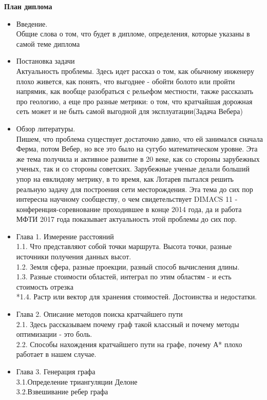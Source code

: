 \Large{\bf{План диплома}}
\begin{itemize}
\item Введение.\\
Общие слова о том, что будет в дипломе, определения, которые указаны в самой теме диплома
\item Постановка задачи\\
Актуальность проблемы. Здесь идет рассказ о том, как обычному инженеру плохо живется, как понять, что выгоднее - обойти болото или пройти напрямик, как вообще разобраться с рельефом местности, также рассказать про геологию, а еще про разные метрики: о том, что кратчайшая дорожная сеть может и не быть самой выгодной для эксплуатации(Задача Вебера)
\item Обзор литературы.\\
 Пишем, что проблема существует достаточно давно, что ей занимался сначала Ферма, потом Вебер, но все это было на сугубо математическом уровне. Эта же тема получила и активное развитие в 20 веке, как со стороны зарубежных ученых, так и со стороны советских. Зарубежные ученые делали больший упор на евклидову метрику, в то время, как Лотарев пытался решить реальную задачу для построения сети месторождения. Эта тема до сих пор интересна научному сообществу, о чем свидетельствует DIMACS 11 - конференция-соревнование проходившее в конце 2014 года, да и работа МФТИ 2017 года показывает актуальность этой проблемы до сих пор.
\item Глава 1. Измерение расстояний\\
1.1. Что представляют собой точки маршрута. Высота точки, разные источники получения данных высот.\\ 1.2. Земля сфера, разные проекции, разный способ вычисления длины.\\
1.3. Разные стоимости областей, интеграл по этим областям - и есть стоимость отрезка\\
*1.4. Растр или вектор для хранения стоимостей. Достоинства и недостатки.
\item Глава 2. Описание методов поиска кратчайшего пути\\
2.1. Здесь рассказываем почему граф такой классный и почему методы оптимизации - это боль.\\
2.2. Способы нахождения кратчайшего пути на графе, почему А* плохо работает в нашем случае.
\item Глава 3. Генерация графа\\
3.1.Определение триангуляции Делоне\\
3.2.Взвешивание ребер графа\\

\end{itemize}
